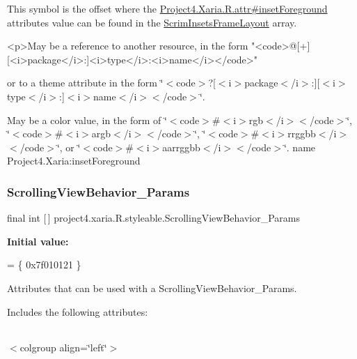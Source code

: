 This symbol is the offset where the \hyperlink{}{Project4.\+Xaria.\+R.\+attr\#inset\+Foreground} attribute\textquotesingle{}s value can be found in the \hyperlink{classproject4_1_1xaria_1_1R_1_1styleable_aced6ff23371b3f5a2ea43a4c9a57f9eb}{Scrim\+Insets\+Frame\+Layout} array.

\begin{DoxyVerb}      <p>May be a reference to another resource, in the form "<code>@[+][<i>package</i>:]<i>type</i>:<i>name</i></code>"
\end{DoxyVerb}
 or to a theme attribute in the form \char`\"{}$<$code$>$?\mbox{[}$<$i$>$package$<$/i$>$\+:\mbox{]}\mbox{[}$<$i$>$type$<$/i$>$\+:\mbox{]}$<$i$>$name$<$/i$>$$<$/code$>$\char`\"{}. 

May be a color value, in the form of \char`\"{}$<$code$>$\#$<$i$>$rgb$<$/i$>$$<$/code$>$\char`\"{}, \char`\"{}$<$code$>$\#$<$i$>$argb$<$/i$>$$<$/code$>$\char`\"{}, \char`\"{}$<$code$>$\#$<$i$>$rrggbb$<$/i$>$$<$/code$>$\char`\"{}, or \char`\"{}$<$code$>$\#$<$i$>$aarrggbb$<$/i$>$$<$/code$>$\char`\"{}.  name Project4.\+Xaria\+:inset\+Foreground \mbox{\label{classproject4_1_1xaria_1_1R_1_1styleable_ad06c19e0a242a55e8ea1a03b55b964d9}} 
\subsubsection{\texorpdfstring{Scrolling\+View\+Behavior\+\_\+\+Params}{ScrollingViewBehavior\_Params}}
{\footnotesize\ttfamily final int \mbox{[}$\,$\mbox{]} project4.\+xaria.\+R.\+styleable.\+Scrolling\+View\+Behavior\+\_\+\+Params\hspace{0.3cm}{\ttfamily [static]}}

{\bfseries Initial value\+:}
\begin{DoxyCode}
= \{
            0x7f010121
        \}
\end{DoxyCode}
Attributes that can be used with a Scrolling\+View\+Behavior\+\_\+\+Params. 

Includes the following attributes\+:

\tabulinesep=1mm
\begin{longtabu} spread 0pt [c]{*{0}{|X[-1]}|}
\hline
\end{longtabu}
$<$colgroup align=\char`\"{}left\char`\"{}$>$ 

